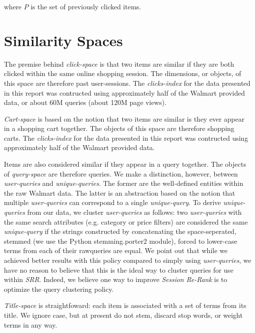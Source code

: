 \documentclass{article}
\begin{document}
where $P$ is the set of previously clicked items. 

\section{Similarity Spaces}

The premise behind {\em click-space} is that two items are similar if they are
both clicked within the same online shopping session. The dimensions, or
objects, of this space are therefore past user-sessions. The {\em clicks-index}
for the data presented in this report was contructed using approximately half of
the Walmart provided data, or about 60M queries (about 120M page views).

{\em Cart-space} is based on the notion that two items are similar is they ever
appear in a shopping cart together. The objects of this space are therefore
shopping carts. The {\em clicks-index} for the data presented in this report was
contructed using approximately half of the Walmart provided data.

Items are also considered similar if they appear in a query together. The
objects of {\em query-space} are therefore queries. We make a distinction,
however, between {\em user-queries} and {\em unique-queries}. The former are the
well-defined entities within the raw Walmart data. The latter is an abstraction
based on the notion that multiple {\em user-queries} can correspond to a single
{\em unique-query}. To derive {\em unique-queries} from our data, we cluster
{\em user-queries} as follows: two {\em user-queries} with the same search
attributes (e.g. category or price filters) are considered the same {\em
unique-query} if the strings constructed by concatenating the space-seperated,
stemmed (we use the Python stemming.porter2 module), forced to lower-case terms
from each of their rawqueries are equal. We point out that while we achieved
better results with this policy compared to simply using {\em user-queries}, we
have no reason to believe that this is the ideal way to cluster queries for use
within {\em SRR}. Indeed, we believe one way to improve {\em Session
Re-Rank} is to optimize the query clustering policy.

{\em Title-space} is straightfoward: each item is associated with a set of terms
from its title. We ignore case, but at present do not stem, discard stop words,
or weight terms in any way. 
\end{document}
